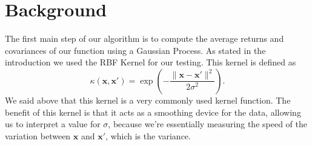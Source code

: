 \documentclass{article}
\begin{document}
\section{Background}
\label{background}
The first main step of our algorithm is to compute the average returns and covariances of our function using a Gaussian Process.  As stated in the introduction we used the RBF Kernel for our testing.  This kernel is defined as 
\begin{equation}
	\kappa (\textbf{x}, \textbf{x}') = \exp \left( - \frac{\|\textbf{x} - \textbf{x}' \|^2}{2\sigma^2} \right).
    \label{eqn:RBF}
\end{equation}
We said above that this kernel is a very commonly used kernel function.  The benefit of this kernel is that it acts as a smoothing device for the data, allowing us to interpret a value for $\sigma$, because we're essentially measuring the speed of the variation between $\textbf{x}$ and $\textbf{x}'$, which is the variance.
\end{document}
